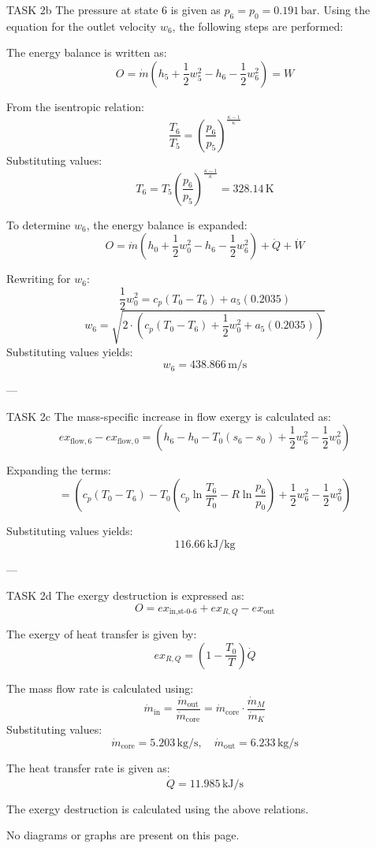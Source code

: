 TASK 2b  
The pressure at state 6 is given as \( p_6 = p_0 = 0.191 \, \text{bar} \). Using the equation for the outlet velocity \( w_6 \), the following steps are performed:  

The energy balance is written as:  
\[
O = \dot{m} \left( h_5 + \frac{1}{2} w_5^2 - h_6 - \frac{1}{2} w_6^2 \right) = W
\]  

From the isentropic relation:  
\[
\frac{T_6}{T_5} = \left( \frac{p_6}{p_5} \right)^{\frac{\kappa - 1}{\kappa}}
\]  
Substituting values:  
\[
T_6 = T_5 \left( \frac{p_6}{p_5} \right)^{\frac{\kappa - 1}{\kappa}} = 328.14 \, \text{K}
\]  

To determine \( w_6 \), the energy balance is expanded:  
\[
O = \dot{m} \left( h_0 + \frac{1}{2} w_0^2 - h_6 - \frac{1}{2} w_6^2 \right) + \dot{Q} + \dot{W}
\]  

Rewriting for \( w_6 \):  
\[
\frac{1}{2} w_0^2 = c_p \left( T_0 - T_6 \right) + a_5 (0.2035)
\]  
\[
w_6 = \sqrt{2 \cdot \left( c_p \left( T_0 - T_6 \right) + \frac{1}{2} w_0^2 + a_5 (0.2035) \right)}
\]  
Substituting values yields:  
\[
w_6 = 438.866 \, \text{m/s}
\]  

---

TASK 2c  
The mass-specific increase in flow exergy is calculated as:  
\[
ex_{\text{flow},6} - ex_{\text{flow},0} = \left( h_6 - h_0 - T_0 (s_6 - s_0) + \frac{1}{2} w_6^2 - \frac{1}{2} w_0^2 \right)
\]  

Expanding the terms:  
\[
= \left( c_p (T_0 - T_6) - T_0 \left( c_p \ln \frac{T_6}{T_0} - R \ln \frac{p_6}{p_0} \right) + \frac{1}{2} w_6^2 - \frac{1}{2} w_0^2 \right)
\]  

Substituting values yields:  
\[
116.66 \, \text{kJ/kg}
\]  

---

TASK 2d  
The exergy destruction is expressed as:  
\[
O = ex_{\text{in,st-0-6}} + ex_{R,Q} - ex_{\text{out}}
\]  

The exergy of heat transfer is given by:  
\[
ex_{R,Q} = \left( 1 - \frac{T_0}{T} \right) \dot{Q}
\]  

The mass flow rate is calculated using:  
\[
\dot{m}_{\text{in}} = \frac{\dot{m}_{\text{out}}}{\dot{m}_{\text{core}}} = \dot{m}_{\text{core}} \cdot \frac{\dot{m}_M}{\dot{m}_K}
\]  
Substituting values:  
\[
\dot{m}_{\text{core}} = 5.203 \, \text{kg/s}, \quad \dot{m}_{\text{out}} = 6.233 \, \text{kg/s}
\]  

The heat transfer rate is given as:  
\[
\dot{Q} = 11.985 \, \text{kJ/s}
\]  

The exergy destruction is calculated using the above relations.  

No diagrams or graphs are present on this page.